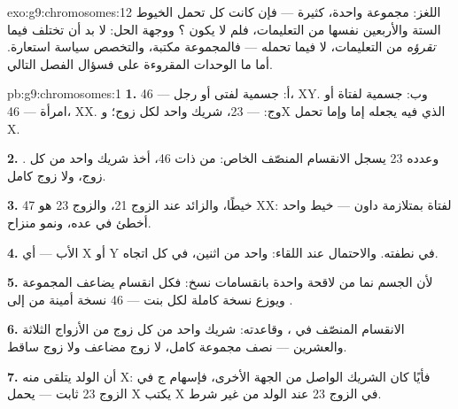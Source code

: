 \begin{solution}{exo:g9:chromosomes:12}
اللغز: مجموعة واحدة،   كثيرة --- فإن كانت كل
 تحمل الخيوط الستة والأربعين نفسها من التعليمات، فلم
لا يكون   ؟ ووجهة الحل: لا بد أن تختلف
 فيما \emph{تقرؤه} من التعليمات، لا فيما تحمله ---
فالمجموعة مكتبة، والتخصص سياسة استعارة. أما ما الوحدات
المقروءة على  فسؤال الفصل التالي.
\end{solution}

\begin{solution}{pb:g9:chromosomes:1}
\textbf{1.} أ:  جسمية لفتى أو رجل --- 46، XY. وب:
 جسمية لفتاة أو امرأة --- 46، XX. وج:  --- 23،
شريك واحد لكل زوج؛ وX الذي فيه يجعله إما  وإما 
تحمل X.

\textbf{2.} . وعدده 23 يسجل الانقسام المنصّف الخاص:
من  ذات 46، أخذ شريك واحد من كل زوج، ولا زوج كامل.

\textbf{3.} 47 خيطًا، والزائد عند الزوج 21، والزوج 23
هو XX:  لفتاة بمتلازمة داون --- خيط واحد
أخطئ في عده، ونمو منزاح.

\textbf{4.}  الأب --- أي X أو Y في نطفته. والاحتمال
عند اللقاء: واحد من اثنين، في كل اتجاه.

\textbf{5.} لأن الجسم نما من لاقحة واحدة بانقسامات نسخ:
فكل انقسام يضاعف المجموعة ويوزع نسخة كاملة لكل  بنت
--- 46 نسخة أمينة من  إلى .

\textbf{6.} الانقسام المنصّف في ، وقاعدته: شريك
واحد من كل زوج من الأزواج الثلاثة والعشرين --- نصف
مجموعة كامل، لا زوج مضاعف ولا زوج ساقط.

\textbf{7.} أن الولد يتلقى منه X: فأيًا كان الشريك
الواصل من الجهة الأخرى، فإسهام ج في الزوج 23 ثابت ---
 يحمل X يكتب X في الزوج 23 عند الولد من غير شرط.


\end{solution}

